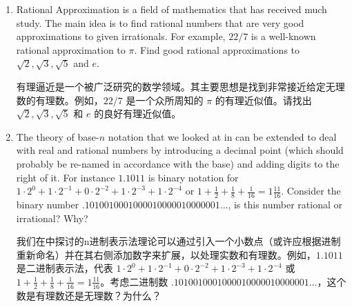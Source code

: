 \begin{enumerate}

    \item {} Rational Approximation is 
    a field of mathematics that has received much study. The main idea 
    is to find rational numbers that are very good approximations to
    given irrationals. For example, $22/7$ is a well-known rational 
    approximation to $\pi$.  Find good rational approximations to 
    $\sqrt{2}, \sqrt{3}, \sqrt{5}$ and $e$.
    
    有理逼近是一个被广泛研究的数学领域。其主要思想是找到非常接近给定无理数的有理数。例如，$22/7$ 是一个众所周知的 $\pi$ 的有理近似值。请找出 $\sqrt{2}, \sqrt{3}, \sqrt{5}$ 和 $e$ 的良好有理近似值。
    \vfill
    
    \wbvfill
    
    
    \vfill
    
    \item The theory of base-$n$ notation that we looked at in 
     can be extended to deal with real and 
    rational numbers by introducing a decimal point (which should 
    probably be re-named in accordance with the base) and adding 
    digits to the right of it. For instance $1.1011$ is binary notation
    for $1 \cdot 2^0 + 1 \cdot 2^{-1} + 0 \cdot 2^{-2} + 
    1\cdot 2^{-3} + 1\cdot 2^{-4}$ or $\displaystyle 1 + \frac{1}{2} + 
    \frac{1}{8} + \frac{1}{16} = 1 \frac{11}{16}$.
    Consider the binary number $.1010010001000010000010000001\ldots$, 
    is this number rational or irrational?  Why?
    
    我们在中探讨的n进制表示法理论可以通过引入一个小数点（或许应根据进制重新命名）并在其右侧添加数字来扩展，以处理实数和有理数。例如，$1.1011$ 是二进制表示法，代表 $1 \cdot 2^0 + 1 \cdot 2^{-1} + 0 \cdot 2^{-2} + 1\cdot 2^{-3} + 1\cdot 2^{-4}$ 或 $\displaystyle 1 + \frac{1}{2} + \frac{1}{8} + \frac{1}{16} = 1 \frac{11}{16}$。考虑二进制数 $.1010010001000010000010000001\ldots$，这个数是有理数还是无理数？为什么？
    \vfill
    

\end{enumerate}
